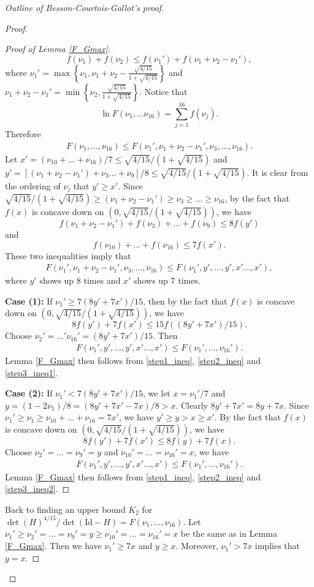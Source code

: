 \documentclass{article}
\newcommand{\id}{\mathrm{Id}}
\theoremstyle{definition}
\begin{document}
\begin{proof}[Outline of Besson-Courtois-Gallot's proof]
\begin{proof}
\begin{proof}[Proof of Lemma \ref{F_Gmax}]
$$f(\nu_1)+f(\nu_2)\leq f(\nu_1')+f(\nu_1+\nu_2-\nu_1'),$$
where $\nu_1'=\max\left\{\nu_1,\nu_1+\nu_2-\frac{\sqrt{4/15}}{1+\sqrt{4/15}}\right\}$ and $\nu_1+\nu_2-\nu_1'=\min\left\{\nu_2,\frac{\sqrt{4/15}}{1+\sqrt{4/15}}\right\}$. Notice that
$$\ln F(\nu_1,...\nu_{16})=\sum_{j=1}^{16}f(\nu_j).$$
Therefore
\begin{align}\label{step1_ineq}
F(\nu_1,...,\nu_{16})\leq F(\nu_1',\nu_1+\nu_2-\nu_1',\nu_3,...,\nu_{16}).\end{align}
Let $x'=(\nu_{10}+...+\nu_{16})/7\leq \sqrt{4/15}/(1+\sqrt{4/15})$ and $y'=[(\nu_1+\nu_2-\nu_1')+\nu_3...+\nu_9]/8\leq \sqrt{4/15}/(1+\sqrt{4/15})$. It is clear from the ordering of $\nu_j$ that $y'\geq x'$. Since $\sqrt{4/15}/(1+\sqrt{4/15})\geq (\nu_1+\nu_2-\nu_1')\geq \nu_3\geq...\geq\nu_{16}$, by the fact that $f(x)$ is concave down on $(0,\sqrt{4/15}/(1+\sqrt{4/15}))$, we have
$$f(\nu_1+\nu_2-\nu_1')+f(\nu_3)+...+f(\nu_9)\leq 8f(y')$$
and
$$f(\nu_{10})+...+f(\nu_{16})\leq 7f(x').$$
These two inequalities imply that
\begin{align}\label{step2_ineq}
F(\nu_1',\nu_1+\nu_2-\nu_1',\nu_3,...,\nu_{16})\leq F(\nu_1',y',...,y',x'...,x'),
\end{align}
where $y'$ shows up $8$ times and $x'$ shows up $7$ times.

\textbf{Case (1):} If $\nu_1'\geq 7(8y'+7x')/15$, then by the fact that $f(x)$ is concave down on $(0,\sqrt{4/15}/(1+\sqrt{4/15}))$, we have
$$8f(y')+7f(x')\leq 15f((8y'+7x')/15).$$
Choose $\nu_2'=...'\nu_{16}'=(8y'+7x')/15$. Then
\begin{align}\label{step3_ineq1}
F(\nu_1',y',...,y',x'...,x')\leq F(\nu_1',...,\nu_{16}').
\end{align}
Lemma \ref{F_Gmax} then follows from \eqref{step1_ineq}, \eqref{step2_ineq} and \eqref{step3_ineq1}.

\textbf{Case (2):} If $\nu_1'< 7(8y'+7x')/15$, we let $x=\nu_1'/7$ and $y=(1-2\nu_1)/8=(8y'+7x'-7x)/8>x$. Clearly $8y'+7x'=8y+7x$. Since $\nu_1'\geq\nu_1\geq\nu_{10}+...+\nu_{16}=7x'$, we have $y'\geq y>x\geq x'$. By the fact that $f(x)$ is concave down on $(0,\sqrt{4/15}/(1+\sqrt{4/15}))$, we have
$$8f(y')+7f(x')\leq 8f(y)+7f(x).$$
Choose $\nu_2'=...=\nu_9'=y$ and $\nu_{10}'=...=\nu_{16}'=x$, we have
\begin{align}\label{step3_ineq2}
F(\nu_1',y',...,y',x'...,x')\leq F(\nu_1',...,\nu_{16}').
\end{align}
Lemma \ref{F_Gmax} then follows from \eqref{step1_ineq}, \eqref{step2_ineq} and \eqref{step3_ineq2}.
\end{proof}
Back to finding an upper bound $K_2$ for $\det(H)^{4/15}/\det(\id-H)=F(\nu_1,...,\nu_{16})$. Let $\nu_1'\geq\nu_2'=...=\nu_9'=y\geq\nu_{10}'=...=\nu_{16}'=x$ be the same as in Lemma \ref{F_Gmax}. Then we have $\nu_1'\geq7x$ and $y\geq x$. Moreover, $\nu_1'>7x$ implies that $y=x$.



\end{proof}
\end{proof}
\end{document}
